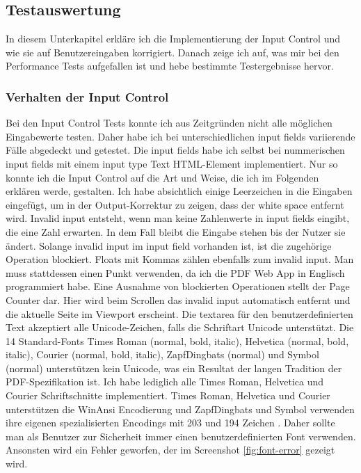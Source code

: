 \subsection{Testauswertung}
In diesem Unterkapitel erkläre ich die Implementierung der Input Control und wie sie auf Benutzereingaben korrigiert. Danach zeige ich auf, was mir bei den Performance Tests aufgefallen ist und hebe bestimmte Testergebnisse hervor.

\subsubsection{Verhalten der Input Control}
Bei den Input Control Tests konnte ich aus Zeitgründen nicht alle möglichen Eingabewerte testen. Daher habe ich bei unterschiedlichen input fields variierende Fälle abgedeckt und getestet. Die input fields habe ich selbst bei nummerischen input fields mit einem input type Text HTML-Element implementiert. Nur so konnte ich die Input Control auf die Art und Weise, die ich im Folgenden erklären werde, gestalten. Ich habe absichtlich einige Leerzeichen in die Eingaben eingefügt, um in der Output-Korrektur zu zeigen, dass der white space entfernt wird. Invalid input entsteht, wenn man keine Zahlenwerte in input fields eingibt, die eine Zahl erwarten. In dem Fall bleibt die Eingabe stehen bis der Nutzer sie ändert. Solange invalid input im input field vorhanden ist, ist die zugehörige Operation blockiert. Floats mit Kommas zählen ebenfalls zum invalid input. Man muss stattdessen einen Punkt verwenden, da ich die PDF Web App in Englisch programmiert habe. Eine Ausnahme von blockierten Operationen stellt der Page Counter dar. Hier wird beim Scrollen das invalid input automatisch entfernt und die aktuelle Seite im Viewport erscheint. Die textarea für den benutzerdefinierten Text akzeptiert alle Unicode-Zeichen, falls die Schriftart Unicode unterstützt. Die 14 Standard-Fonts Times Roman (normal, bold, italic), Helvetica (normal, bold, italic), Courier (normal, bold, italic), ZapfDingbats (normal) und Symbol (normal) unterstützen kein Unicode, was ein Resultat der langen Tradition der PDF-Spezifikation ist. Ich habe lediglich alle Times Roman, Helvetica und Courier Schriftschnitte implementiert. Times Roman, Helvetica und Courier unterstützen die WinAnsi Encodierung und ZapfDingbats und Symbol verwenden ihre eigenen spezialisierten Encodings mit 203 und 194 Zeichen \cite{pdf-lib}. Daher sollte man als Benutzer zur Sicherheit immer einen benutzerdefinierten Font verwenden. Ansonsten wird ein Fehler geworfen, der im Screenshot \ref{fig:font-error} gezeigt wird.

